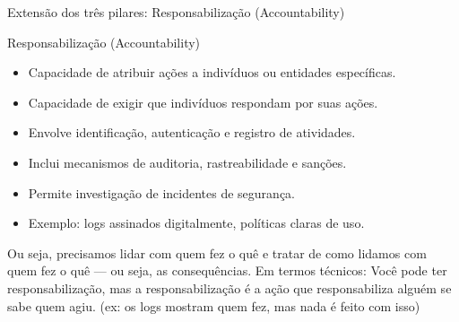 \begin{frame}{Extensão dos três pilares: Responsabilização (Accountability)}
    \begin{block}{Responsabilização (Accountability)}
        \begin{itemize}
            \item Capacidade de atribuir ações a indivíduos ou entidades específicas.
            \item Capacidade de exigir que indivíduos respondam por suas ações.
            \item Envolve identificação, autenticação e registro de atividades.
            \item Inclui mecanismos de auditoria, rastreabilidade e sanções.
            \item Permite investigação de incidentes de segurança.
            \item Exemplo: logs assinados digitalmente, políticas claras de uso.
        \end{itemize}
    \end{block}


    Ou seja, precisamos lidar com quem fez o quê e tratar de como lidamos com quem fez o quê — ou seja, as consequências. Em termos técnicos: Você pode ter responsabilização, mas a responsabilização é a ação que responsabiliza alguém se sabe quem agiu.
    (ex: os logs mostram quem fez, mas nada é feito com isso)

\end{frame}


